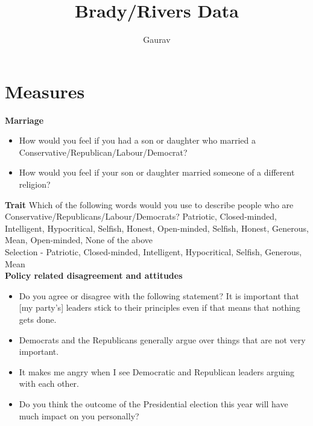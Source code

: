 \documentclass[a4paper]{article}
\begin{document}
\title{Brady/Rivers Data}
\author{Gaurav}

\maketitle
\begin{comment}
 
sweaver("C:/Users/Gaurav/Desktop/R/polar", "rivers")

\end{comment}
\section{Measures}
\textbf{Marriage}
\begin{itemize}
\item How would you feel if you had a son or daughter who married a Conservative/Republican/Labour/Democrat?
\item How would you feel if your son or daughter married someone of a different religion?
\end{itemize}
\textbf{Trait} Which of the following words would you use to describe people who are Conservative/Republicans/Labour/Democrats?  
Patriotic, Closed-minded, Intelligent, Hypocritical, Selfish, Honest, Open-minded, Selfish, 
Honest, Generous, Mean, Open-minded, None of the above\\
Selection - Patriotic, Closed-minded, Intelligent, Hypocritical, Selfish, Generous, Mean\\
\textbf{Policy related disagreement and attitudes}
\begin{itemize}
\item Do you agree or disagree with the following statement? It is important that [my party's] 
leaders stick to their principles even if that means that nothing gets done.
\item  Democrats and the Republicans generally argue over things that are not very important.
\item It makes me angry when I see Democratic and Republican leaders arguing with each other.
\item  Do you think the outcome of the Presidential election this year will have much impact on you personally?
\end{itemize}
\end{document}
